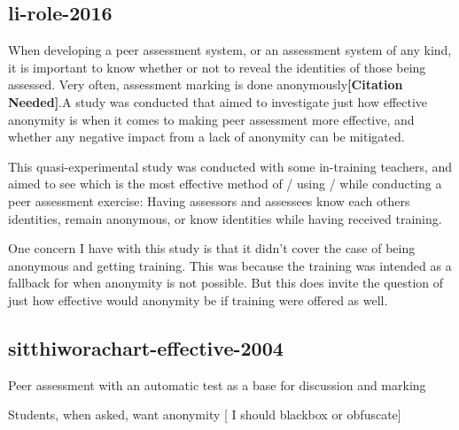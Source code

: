 \documentclass[a4paper,11pt]{report}
\newcommand{\cn}{\textbf{[Citation Needed]}}
\begin{document}
\subsection{li-role-2016}
When developing a peer assessment system, or an assessment system of any kind, it is important to know whether or not to reveal the identities of those being assessed. Very often, assessment marking is done anonymously\cn.A study was conducted\cite{li_role_2016} that aimed to investigate just how effective anonymity is when it comes to making peer assessment more effective, and whether any negative impact from a lack of anonymity can be mitigated.\par
This quasi-experimental study was conducted with some in-training teachers, and aimed to see which is the most effective method of / using / while conducting a peer assessment exercise: Having assessors and assessees know each others identities, remain anonymous, or know identities while having received training.\par
One concern I have with this study is that it didn't cover the case of being anonymous and getting training. This was because the training was intended as a fallback for when anonymity is not possible. But this does invite the question of just how effective would anonymity be if training were offered as well.\par

\subsection{sitthiworachart-effective-2004}
Peer assessment with an automatic test as a base for discussion and marking\cite{sitthiworachart_effective_2004}\par
Students, when asked, want anonymity [ I should blackbox or obfuscate]\par
\end{document}
